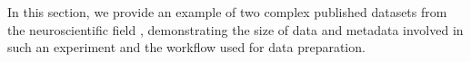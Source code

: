In this section, we provide an example of two complex published datasets from the neuroscientific field \citep{Brochier_2018}, demonstrating the size of data and metadata involved in such an experiment and the workflow used for data preparation.


% 
% 
% 
% 


% 
% 
% 
% 
% 



